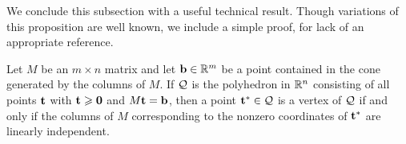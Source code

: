 \documentclass[11pt]{amsart}
\begin{document}





We conclude this subsection with a useful technical result.
Though variations of this proposition are well known, we include a simple proof, for lack of an appropriate reference.


\begin{proposition}  
\label{vertex: L}
Let $M$ be an $m \times n$ matrix and let $\mathbf{b} \in \mathbb{R}^m$ be a point contained in the cone generated by the columns of $M$.  If $\mathcal{Q}$ is the polyhedron in $\mathbb{R}^n$  consisting of all points $\mathbf{t}$ with $\mathbf{t} \geqslant \mathbf{0}$ and $M \mathbf{t} = \mathbf{b}$, then a point $\mathbf{t}^{\ast} \in \mathcal{Q}$ is a vertex of $\mathcal{Q}$ if and only if the columns of $M$ corresponding to the nonzero coordinates of $\mathbf{t}^{\ast}$ are linearly independent.  %
\end{proposition}
\end{document}
